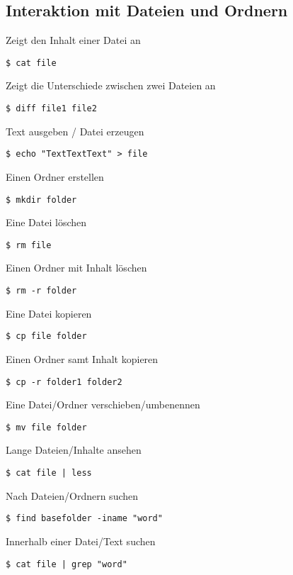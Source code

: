 \subsection {Interaktion mit Dateien und Ordnern}

\begin{multicols}{2}
Zeigt den Inhalt einer Datei an
\begin{lstlisting}
$ cat file
\end{lstlisting}
\columnbreak
Zeigt die Unterschiede zwischen zwei Dateien an
\begin{lstlisting}
$ diff file1 file2
\end{lstlisting}
\end{multicols}

\begin{multicols}{2}
Text ausgeben / Datei erzeugen
\begin{lstlisting}
$ echo "TextTextText" > file
\end{lstlisting}
\columnbreak
Einen Ordner erstellen
\begin{lstlisting}
$ mkdir folder
\end{lstlisting}
\end{multicols}

\begin{multicols}{2}
Eine Datei löschen
\begin{lstlisting}
$ rm file
\end{lstlisting}
\columnbreak
Einen Ordner mit Inhalt löschen
\begin{lstlisting}
$ rm -r folder
\end{lstlisting}
\end{multicols}

\begin{multicols}{2}
Eine Datei kopieren
\begin{lstlisting}
$ cp file folder
\end{lstlisting}
\columnbreak
Einen Ordner samt Inhalt kopieren
\begin{lstlisting}
$ cp -r folder1 folder2
\end{lstlisting}
\end{multicols}

\begin{multicols}{2}
Eine Datei/Ordner verschieben/umbenennen
\begin{lstlisting}
$ mv file folder
\end{lstlisting}
\columnbreak
Lange Dateien/Inhalte ansehen
\begin{lstlisting}
$ cat file | less
\end{lstlisting}
\end{multicols}


\begin{multicols}{2}
Nach Dateien/Ordnern suchen
\begin{lstlisting}
$ find basefolder -iname "word"
\end{lstlisting}
\columnbreak
Innerhalb einer Datei/Text suchen
\begin{lstlisting}
$ cat file | grep "word"
\end{lstlisting}
\end{multicols}


